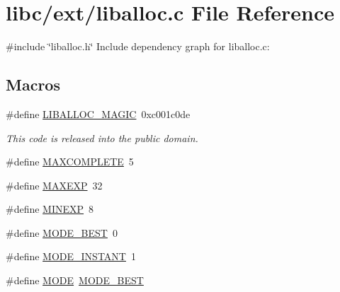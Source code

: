 \hypertarget{a00035}{}\section{libc/ext/liballoc.c File Reference}
\label{a00035}
{\ttfamily \#include \char`\"{}liballoc.\+h\char`\"{}}\newline
Include dependency graph for liballoc.\+c\+:
\subsection*{Macros}
\begin{DoxyCompactItemize}
\item 
\#define \hyperlink{a00035_af6b1d459ffa3c81e2456acf8d4268330_af6b1d459ffa3c81e2456acf8d4268330}{L\+I\+B\+A\+L\+L\+O\+C\+\_\+\+M\+A\+G\+IC}~0xc001c0de
\begin{DoxyCompactList}\small\item\em This code is released into the public domain. \end{DoxyCompactList}\item 
\#define \hyperlink{a00035_a08b7f1e029a0c835f3639557d8ad7a36_a08b7f1e029a0c835f3639557d8ad7a36}{M\+A\+X\+C\+O\+M\+P\+L\+E\+TE}~5
\item 
\#define \hyperlink{a00035_af823bb7d083fafbd662be7ea09582013_af823bb7d083fafbd662be7ea09582013}{M\+A\+X\+E\+XP}~32
\item 
\#define \hyperlink{a00035_ae7249b0af4d1bfe02a4c7bdbf810bd8c_ae7249b0af4d1bfe02a4c7bdbf810bd8c}{M\+I\+N\+E\+XP}~8
\item 
\#define \hyperlink{a00035_a881288ad0450ab9858bf01b030e755b0_a881288ad0450ab9858bf01b030e755b0}{M\+O\+D\+E\+\_\+\+B\+E\+ST}~0
\item 
\#define \hyperlink{a00035_aedc513524290b468e893e1bc4f5cba2f_aedc513524290b468e893e1bc4f5cba2f}{M\+O\+D\+E\+\_\+\+I\+N\+S\+T\+A\+NT}~1
\item 
\#define \hyperlink{a00035_ab8c52c1b4c021ed3e6b6b677bd2ac019_ab8c52c1b4c021ed3e6b6b677bd2ac019}{M\+O\+DE}~\hyperlink{a00035_a881288ad0450ab9858bf01b030e755b0_a881288ad0450ab9858bf01b030e755b0}{M\+O\+D\+E\+\_\+\+B\+E\+ST}
\end{DoxyCompactItemize}
